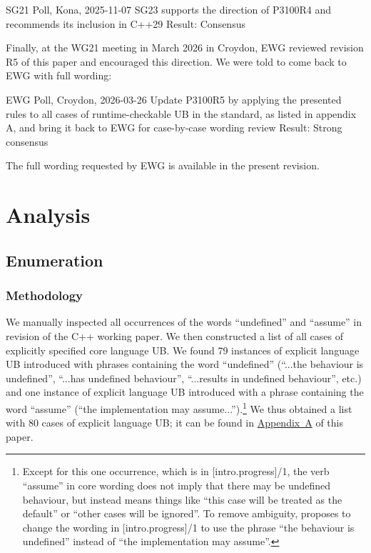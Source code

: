 \vspace{2mm}
\begin{wgpoll}{{SG21 Poll, Kona, 2025-11-07}}
SG23 supports the direction of P3100R4 and recommends its inclusion in C++29
Result: Consensus
\end{wgpoll}
\vspace{2mm}

Finally, at the WG21 meeting in March 2026 in Croydon, EWG reviewed revision R5 of this paper and encouraged this direction. We were told to come back to EWG with full wording:

\vspace{2mm}
\begin{wgpoll}{{EWG Poll, Croydon, 2026-03-26}}
Update P3100R5 by applying the presented rules to all cases of runtime-checkable UB in the standard, as listed in appendix A, and bring it back to EWG for case-by-case wording review
Result: Strong consensus
\end{wgpoll}
\vspace{2mm}

The full wording requested by EWG is available in the present revision.

\section{Analysis}
\label{analysis}

\subsection{Enumeration}

\subsubsection{Methodology}

We manually inspected all occurrences of the words ``undefined'' and ``assume'' in revision \cite{N5014} of the C++ working paper.
We then constructed a list of all cases of explicitly specified core language UB. We found 79 instances of explicit language UB introduced with phrases containing the word ``undefined'' (``...the behaviour is undefined'', ``...has undefined behaviour'', ``...results in undefined behaviour'', etc.) and one instance of explicit language UB introduced with a phrase containing the word ``assume'' (``the implementation may assume...'').\footnote{Except for this one occurrence, which is in [intro.progress]/1, the verb ``assume'' in core wording does not imply that there may be undefined behaviour, but instead means things like ``this case will be treated as the default'' or ``other cases will be ignored''. To remove ambiguity, \cite{CWG2816} proposes to change the wording in [intro.progress]/1 to use the phrase ``the behaviour is undefined'' instead of ``the implementation may assume''.} We thus obtained a list with 80 cases of explicit language UB; it can be found in \hyperref[appendix]{Appendix~A} of this paper.


